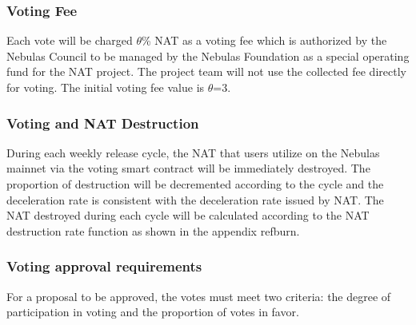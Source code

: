 \subsubsection{Voting Fee}

Each vote will be charged $\theta$\% NAT as a voting fee which is authorized by the Nebulas Council to be managed by the Nebulas Foundation as a special operating fund for the NAT project. The project team will not use the collected fee directly for voting. The initial voting fee value is $\theta$=3.

\subsubsection{Voting and NAT Destruction}

During each weekly release cycle, the NAT that users utilize on the Nebulas mainnet via the voting smart contract will be immediately destroyed. The proportion of destruction will be decremented according to the cycle and the deceleration rate is consistent with the deceleration rate issued by NAT. The NAT destroyed during each cycle will be calculated according to the NAT destruction rate function as shown in the appendix ref{burn}.

\subsubsection{Voting approval requirements}
	
For a proposal to be approved, the votes must meet two criteria: the degree of participation in voting and the proportion of votes in favor.

